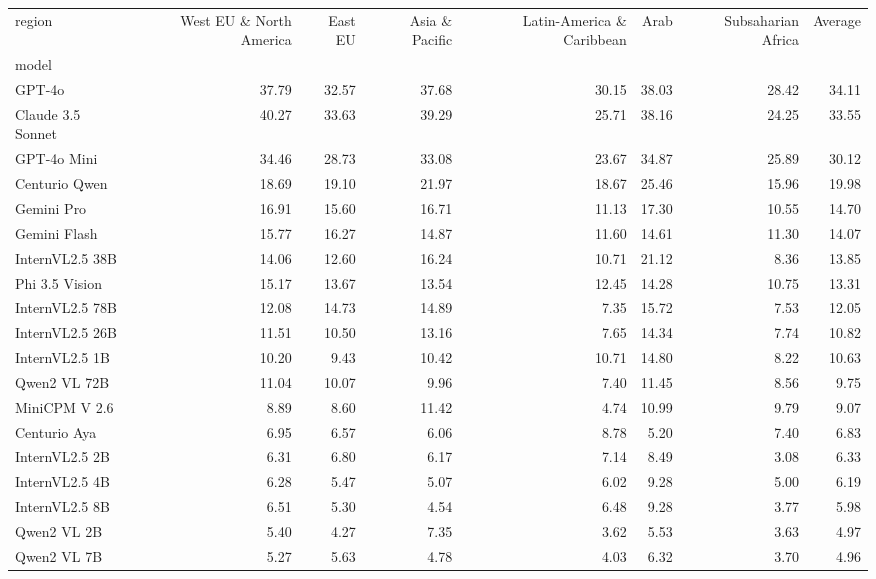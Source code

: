 \begin{tabular}{lrrrrrrr}
\toprule
region & West EU \& North America & East EU & Asia \& Pacific & Latin-America \& Caribbean & Arab & Subsaharian Africa & Average \\
model &  &  &  &  &  &  &  \\
\midrule
\rowcolor{gray!20}
GPT-4o & 37.79 & 32.57 & 37.68 & 30.15 & 38.03 & 28.42 & 34.11 \\
Claude 3.5 Sonnet & 40.27 & 33.63 & 39.29 & 25.71 & 38.16 & 24.25 & 33.55 \\
\rowcolor{gray!20}
GPT-4o Mini & 34.46 & 28.73 & 33.08 & 23.67 & 34.87 & 25.89 & 30.12 \\
Centurio Qwen & 18.69 & 19.10 & 21.97 & 18.67 & 25.46 & 15.96 & 19.98 \\
\rowcolor{gray!20}
Gemini Pro & 16.91 & 15.60 & 16.71 & 11.13 & 17.30 & 10.55 & 14.70 \\
Gemini Flash & 15.77 & 16.27 & 14.87 & 11.60 & 14.61 & 11.30 & 14.07 \\
\rowcolor{gray!20}
InternVL2.5 38B & 14.06 & 12.60 & 16.24 & 10.71 & 21.12 & 8.36 & 13.85 \\
Phi 3.5 Vision & 15.17 & 13.67 & 13.54 & 12.45 & 14.28 & 10.75 & 13.31 \\
\rowcolor{gray!20}
InternVL2.5 78B & 12.08 & 14.73 & 14.89 & 7.35 & 15.72 & 7.53 & 12.05 \\
InternVL2.5 26B & 11.51 & 10.50 & 13.16 & 7.65 & 14.34 & 7.74 & 10.82 \\
\rowcolor{gray!20}
InternVL2.5 1B & 10.20 & 9.43 & 10.42 & 10.71 & 14.80 & 8.22 & 10.63 \\
Qwen2 VL 72B & 11.04 & 10.07 & 9.96 & 7.40 & 11.45 & 8.56 & 9.75 \\
\rowcolor{gray!20}
MiniCPM V 2.6 & 8.89 & 8.60 & 11.42 & 4.74 & 10.99 & 9.79 & 9.07 \\
Centurio Aya & 6.95 & 6.57 & 6.06 & 8.78 & 5.20 & 7.40 & 6.83 \\
\rowcolor{gray!20}
InternVL2.5 2B & 6.31 & 6.80 & 6.17 & 7.14 & 8.49 & 3.08 & 6.33 \\
InternVL2.5 4B & 6.28 & 5.47 & 5.07 & 6.02 & 9.28 & 5.00 & 6.19 \\
\rowcolor{gray!20}
InternVL2.5 8B & 6.51 & 5.30 & 4.54 & 6.48 & 9.28 & 3.77 & 5.98 \\
Qwen2 VL 2B & 5.40 & 4.27 & 7.35 & 3.62 & 5.53 & 3.63 & 4.97 \\
\rowcolor{gray!20}
Qwen2 VL 7B & 5.27 & 5.63 & 4.78 & 4.03 & 6.32 & 3.70 & 4.96 \\

\end{tabular}
